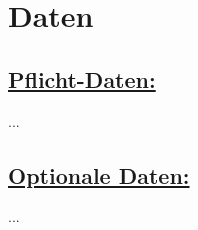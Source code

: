 %
%


\chapter{Daten}
\label{Daten}


\section*{\underline{Pflicht-Daten:}}

...
\\


\section*{\underline{Optionale Daten:}}

...
\\


